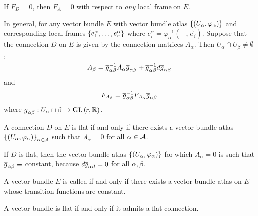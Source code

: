 \documentclass[main.tex]{subfiles}
\begin{document}
\begin{note}
  If $F_D = 0$, then $F_A = 0$ with respect to {\it any} local frame on $E$.
\end{note}

In general, for any vector bundle $E$ with vector bundle atlas $\left\{ (U_\alpha, \varphi_\alpha) \right\}$ and corresponding local frames $\left\{e_1^\alpha, \dots, e_r^\alpha\right\}$ where $e_i^\alpha = \varphi_\alpha^{-1}(-, \vec{e}_i)$. Suppose that the connection $D$ on $E$ is given by the connection matrices $A_{\alpha}$. Then $U_\alpha \cap U_\beta \neq \emptyset$,
\[
A_\beta = \overline{g}_{\alpha\beta}^{-1} A_\alpha \overline{g}_{\alpha\beta} + \overline{g}_{\alpha\beta}^{-1} d\overline{g}_{\alpha\beta}
\]
and
\[
F_{A_\beta} = \overline{g}_{\alpha\beta}^{-1} F_{A_\alpha} \overline{g}_{\alpha\beta}
\]
where $\overline{g}_{\alpha\beta}: U_\alpha \cap \beta \to \text{GL}\left( r, \mathbb{R} \right)$.

\begin{thm}
  A connection $D$ on $E$ is flat if and only if there exists a vector bundle atlas $\left\{ (U_\alpha, \varphi_\alpha) \right\}_{\alpha \in \mathcal{A}}$ such that $A_\alpha = 0$ for all $\alpha \in \mathcal{A}$.
\end{thm}

\begin{rmk}
    If $D$ is flat, then the vector bundle atlas $\left\{ (U_\alpha, \varphi_\alpha)\right\}$ for which $A_\alpha = 0$ is such that $\overline{g}_{\alpha\beta} \equiv $ constant, because $d \overline{g}_{\alpha\beta} = 0$ for all $\alpha, \beta$.
\end{rmk}

\begin{defn}
  A vector bundle $E$ is called  if and only if there exists a vector bundle atlas on $E$ whose transition functions are constant.
\end{defn}

\begin{cor}
  A vector bundle is flat if and only if it admits a flat connection.
\end{cor}
\end{document}
